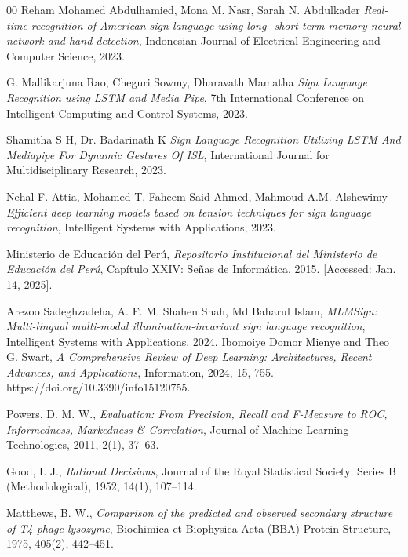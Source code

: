 \documentclass[preprint,12pt,authoryear]{elsarticle}
\begin{document}
\begin{thebibliography}{00}
  Reham Mohamed Abdulhamied, Mona M. Nasr, Sarah N. Abdulkader
  \textit{Real-time recognition of American sign language using long-
short term memory neural network and hand detection},
  Indonesian Journal of Electrical Engineering and Computer Science, 2023.

  G. Mallikarjuna Rao, Cheguri Sowmy, Dharavath Mamatha
  \textit{Sign Language Recognition using LSTM and Media Pipe},
  7th International Conference on Intelligent Computing and Control Systems, 2023.
  
  Shamitha S H, Dr. Badarinath K
  \textit{Sign Language Recognition Utilizing LSTM And
Mediapipe For Dynamic Gestures Of ISL},
  International Journal for Multidisciplinary Research, 2023.

   Nehal F. Attia, Mohamed T. Faheem Said Ahmed, Mahmoud A.M. Alshewimy 
  \textit{Efficient deep learning models based on tension techniques for sign language recognition},
  Intelligent Systems with Applications, 2023.

  
   Ministerio de Educación del Perú, 
   \textit{Repositorio Institucional del Ministerio de Educación del Perú}, Capítulo XXIV: Señas de Informática, 
   2015.
    [Accessed: Jan. 14, 2025].

  Arezoo Sadeghzadeha, A. F. M. Shahen Shah, Md Baharul Islam,
  \textit{MLMSign: Multi-lingual multi-modal illumination-invariant sign language recognition},
  Intelligent Systems with Applications, 2024.
  Ibomoiye Domor Mienye and Theo G. Swart,
  \textit{A Comprehensive Review of Deep Learning: Architectures, Recent Advances, and Applications},
  Information, 2024, 15, 755.
  https://doi.org/10.3390/info15120755.

  Powers, D. M. W.,
  \textit{Evaluation: From Precision, Recall and F-Measure to ROC, Informedness, Markedness \& Correlation},
  Journal of Machine Learning Technologies, 2011, 2(1), 37–63.

  Good, I. J.,
  \textit{Rational Decisions},
  Journal of the Royal Statistical Society: Series B (Methodological), 1952, 14(1), 107–114.

  Matthews, B. W.,
  \textit{Comparison of the predicted and observed secondary structure of T4 phage lysozyme},
  Biochimica et Biophysica Acta (BBA)-Protein Structure, 1975, 405(2), 442–451.


\end{thebibliography}
\end{document}
